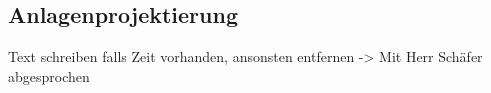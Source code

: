 \documentclass[../../../Bachelorarbeit.tex]{subfiles}
\begin{document}
\subsection{Anlagenprojektierung}
\color{red}
Text schreiben falls Zeit vorhanden, ansonsten entfernen -> Mit Herr Schäfer abgesprochen
\end{document}
